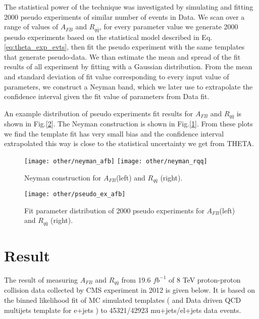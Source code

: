\documentclass{cmspaperpdf}
\begin{document}
The statistical power of the technique was investigated by simulating and fitting 2000 pseudo experiments of similar number of events in Data. We scan over a range of values of $A_{FB}$ and $R_{q \bar q}$, for every parameter value we generate 2000 pseudo experiments based on the statistical model described in Eq.\ref{eq:theta_exp_evts}, then fit the pseudo experiment with the same templates that generate pseudo-data. We than estimate the mean and spread of the fit results of all experiment by fitting with a Gaussian distribution. From the mean and standard deviation of fit value corresponding to every input value of parameters, we construct a Neyman band, which we later use to extrapolate the confidence interval given the fit value of parameters from Data fit.

An example distribution of pseudo experiments fit results for $A_{FB}$ and $R_{q\bar{q}}$ is shown in Fig.[\ref{fig:pseudo-ex}]. The Neyman construction is shown in Fig.[\ref{fig:neyman}]. From these plots we find the template fit has very small bias and the confidence interval extrapolated this way is close to the statistical uncertainty we get from THETA. 

\begin{figure}[hbt]
  \begin{center}
    \texttt{[image: other/neyman\_afb]}
    \texttt{[image: other/neyman\_rqq]}
  \caption{\small Neyman construction for $A_{FB}$(left) and $R_{q\bar q}$ (right).}
    \label{fig:neyman}
  \end{center}
\end{figure}

\begin{figure}[hbt]
  \begin{center}
    \texttt{[image: other/pseudo\_ex\_afb]}
  \caption{\small Fit parameter distribution of 2000 pseudo experiments for $A_{FB}$(left) and $R_{q\bar q}$ (right).}
    \label{fig:pseudo-ex}
  \end{center}
\end{figure}


\clearpage
\section{Result}
\label{sec:results}

The result of measuring $A_{FB}$ and $R_{q\bar{q}}$ from 19.6 $fb^{-1}$ of 8 TeV proton-proton collision data collected by CMS experiment in 2012 is given below. It is based on the binned likelihood fit of MC simulated templates ( and Data driven QCD multijets template for e+jets ) to 45321/42923 mu+jets/el+jets data events. 
\end{document}
